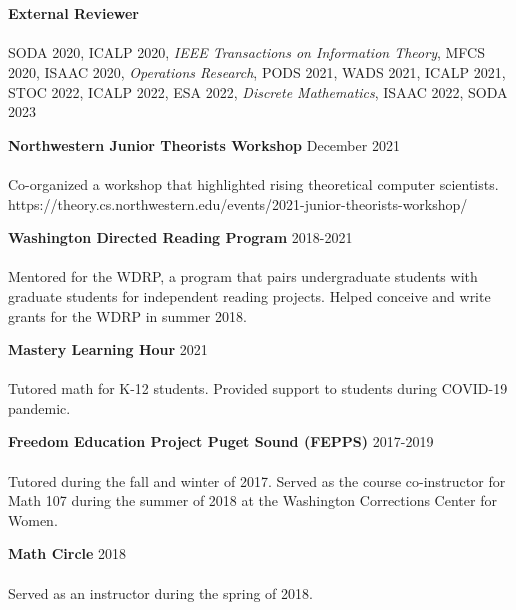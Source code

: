 \documentclass[12 pt]{article}
\newcommand{\lineunder}{\vspace*{-8pt} \\ \hspace*{-18pt} \hrulefill \\}
\newcommand{\header}[1]{{\hspace*{-15pt}\vspace*{6pt} \selectfont{\textsc{#1}}} \vspace*{-6pt} \lineunder}
\newcommand{\employer}[3]{{ \textbf{#1} \hfill #2 \\ #3\\  }}
\newenvironment{achievements}{\begin{list}{$\bullet$}{\topsep 0pt \itemsep -2pt}}{\vspace*{4pt}\end{list}}
\begin{document}
\bigskip




\header{Service and outreach}

\bigskip
\employer{External Reviewer}{}{~}
\vspace{-5mm}
SODA 2020, ICALP 2020, \emph{IEEE Transactions on Information Theory}, MFCS 2020, ISAAC 2020, \emph{Operations Research}, 
PODS 2021, WADS 2021, ICALP 2021, STOC 2022, ICALP 2022, ESA 2022, \emph{Discrete Mathematics}, ISAAC 2022, SODA 2023


\bigskip
\employer{Northwestern Junior Theorists Workshop}{December 2021}{~}
\vspace{-5mm}
Co-organized a workshop that highlighted rising theoretical computer scientists.
https://theory.cs.northwestern.edu/events/2021-junior-theorists-workshop/

\bigskip
\employer{Washington Directed Reading Program}{2018-2021}{~}
\vspace{-5mm}
Mentored for the WDRP, a program that pairs undergraduate students with graduate students for independent reading projects.
Helped conceive and write grants for the WDRP in summer 2018.


\bigskip
\employer{Mastery Learning Hour}{2021}{~}
\vspace{-5mm}
Tutored math for K-12 students. Provided support to students during COVID-19 pandemic.

\bigskip
\employer{Freedom Education Project Puget Sound (FEPPS)}{2017-2019}{~}
\vspace{-5mm}
Tutored during the fall and winter of 2017. Served as the course co-instructor for Math 107
during the summer of 2018 at the Washington Corrections Center for Women.
\bigskip

\employer{Math Circle}{2018}{~}
\vspace{-5mm}
Served as an instructor during the spring of 2018.
\end{document}
